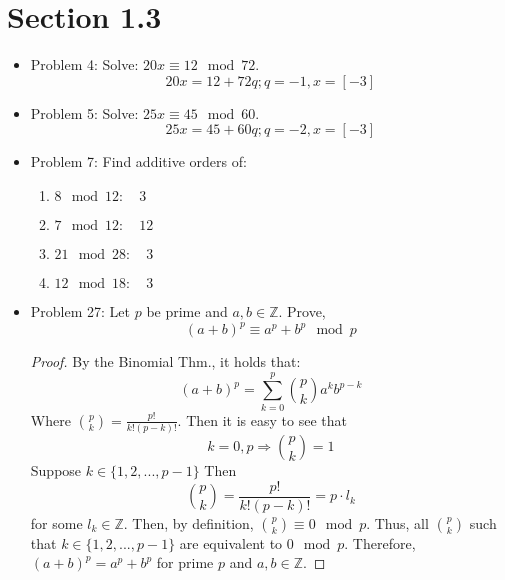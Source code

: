 \documentclass[hidelinks,12pt]{article}
\title{\scalebox{2}{Math 531 Homework 2}}
\author{\scalebox{1.5}{Theo Koss}}
\date{February 2021}
\newcommand{\Z}{\mathbb{Z}}
\begin{document}
\maketitle
\section{Section 1.3}
\begin{itemize}
    \item Problem 4: Solve: $20x\equiv12\mod{72}$.$$20x=12+72q;q=-1,x=[-3]$$
    \item Problem 5: Solve: $25x\equiv45\mod{60}$.$$25x=45+60q;q=-2,x=[-3]$$
    \item Problem 7: Find additive orders of:\begin{enumerate}[label=\alph*.]
        \item $8\mod{12}:\quad3$
        \item $7\mod{12}:\quad12$
        \item $21\mod{28}:\quad3$
        \item $12\mod{18}:\quad3$
    \end{enumerate}
    \item Problem 27: Let $p$ be prime and $a,b\in\Z$. Prove, $$(a+b)^p\equiv a^p+b^p\mod{p}$$
    \begin{proof}
    By the Binomial Thm., it holds that:$$(a+b)^p=\sum_{k=0}^{p}{p\choose k}a^{k}b^{p-k}$$
Where ${p \choose k}=\frac{p!}{k!(p-k)!}$.
Then it is easy to see that $$k=0,p\Longrightarrow{p \choose k}=1$$Suppose $k\in\{1,2,...,p-1\}$ Then $${p \choose k}=\frac{p!}{k!(p-k)!}=p\cdot{l_k}$$ for some $l_{k}\in\mathbb{Z}$.
Then, by definition, ${p \choose k}\equiv0\mod{p}$.
\newline Thus, all ${p \choose k}$ such that $k\in\{1,2,...,p-1\}$ are equivalent to $0\mod{p}$.
Therefore, $(a+b)^p=a^p+b^p$ for prime $p$ and $a,b\in\mathbb{Z}$. 
    \end{proof}
\end{itemize}
\end{document}
